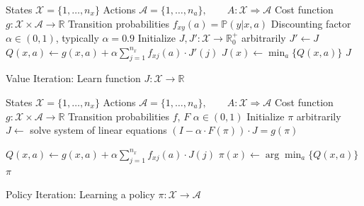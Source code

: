 \documentclass[letter]{article}
\begin{document}
\begin{algorithm}[H]
    \begin{algorithmic}
    \Require
    \Statex States $\mathcal{X} = \{1, \dots, n_x\}$
    \Statex Actions $\mathcal{A} = \{1, \dots, n_a\},\qquad A: \mathcal{X} \Rightarrow \mathcal{A}$
    \Statex Cost function $g: \mathcal{X} \times \mathcal{A} \rightarrow \mathbb{R}$
    \Statex Transition probabilities $f_{xy}(a) = \mathbb{P}(y | x, a)$
    \Statex Discounting factor $\alpha \in (0, 1)$, typically $\alpha = 0.9$
        \State Initialize $J, J': \mathcal{X} \rightarrow \mathbb{R}_0^+$ arbitrarily
            \State $J' \gets J$
                    \State $Q(x, a) \gets g(x, a) + \alpha \sum_{j=1}^{n_x} f_{xj}(a) \cdot J'(j)$
                \EndFor
            \EndFor
                \State $J(x) \gets \min_a \{Q(x, a)\}$
            \EndFor
        \EndWhile
        \Return $J$
    \EndProcedure
    \end{algorithmic}
\caption{Value Iteration\autocite{Sutton:1998:IRL:551283}: Learn function $J: \mathcal{X} \rightarrow \mathbb{R}$}
\label{alg:value-iteration}
\end{algorithm}

\begin{algorithm}[H]
    \begin{algorithmic}
    \Require
    \Statex States $\mathcal{X} = \{1, \dots, n_x\}$
    \Statex Actions $\mathcal{A} = \{1, \dots, n_a\},\qquad A: \mathcal{X} \Rightarrow \mathcal{A}$
    \Statex Cost function $g: \mathcal{X} \times \mathcal{A} \rightarrow \mathbb{R}$
    \Statex Transition probabilities $f$, $F$
    \Statex $\alpha \in (0, 1)$
        \State Initialize $\pi$ arbitrarily
            \State $J \gets$ solve system of linear equations $(I - \alpha \cdot F(\pi)) \cdot J = g(\pi)$

                    \State $Q(x, a) \gets g(x, a) + \alpha \sum_{j=1}^{n_x} f_{xj}(a) \cdot J(j)$
                \EndFor
            \EndFor
                \State $\pi(x) \gets \arg \min_a \{Q(x, a)\}$
            \EndFor
        \EndWhile
        \Return $\pi$
    \EndProcedure
    \end{algorithmic}
\caption{Policy Iteration\autocite{Sutton:1998:IRL:551283}: Learning a policy $\pi: \mathcal{X} \rightarrow \mathcal{A}$}
\label{alg:policy-iteration}
\end{algorithm}
\end{document}
